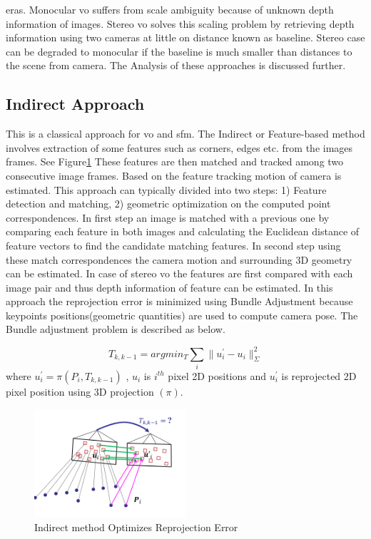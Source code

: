 eras. Monocular \acrshort{vo} suffers from scale ambiguity because of unknown depth information of images. Stereo \acrshort{vo} solves this scaling problem by retrieving depth information using two cameras at little on distance known as baseline. Stereo case can be degraded to monocular if the baseline is much smaller than distances to the scene from camera. The Analysis of these approaches is discussed further.

\subsection{Indirect Approach}

This is a classical approach for \acrshort{vo} and \acrshort{sfm}. The Indirect or Feature-based method involves extraction of some features such as corners, edges etc. from the images frames. See Figure\ref{fig:feature} These features are then matched and tracked among two consecutive image frames. Based on the feature tracking motion of camera is estimated.  This approach can typically divided into two steps: 1) Feature detection and matching, 2) geometric optimization on the computed point correspondences. In first step an image is matched with a previous one by comparing each feature in both images and calculating the Euclidean distance of feature vectors to find the candidate matching features.\cite{Aqel-et-al-2016} In second step using these match correspondences the camera motion and surrounding 3D geometry can be estimated. In case of stereo \acrshort{vo} the features are first compared with each image pair and thus depth information of feature can be estimated. In this approach the reprojection error is minimized using Bundle Adjustment because keypoints positions(geometric quantities) are used to compute camera pose. The Bundle adjustment problem is described as below. 

\begin{equation*}
	T_{k,k-1} = arg min_{T} \sum_{i} \| u^{'}_{i}- u_{i}\|^{2}_{\Sigma}
\end{equation*}
   where   $u^{'}_{i} = \pi (P_{i},T_{k,k-1})$ , $ u_{i} $ is $ i^{th} $  pixel 2D positions and $ u^{'}_{i} $ is reprojected 2D pixel position using 3D projection $(\pi)$.  

\begin{figure}[h]
	\centering
	\includegraphics[width=0.5\textwidth]{indirect}
	\caption{Indirect method Optimizes Reprojection Error}
	\label{fig:feature}
\end{figure}

